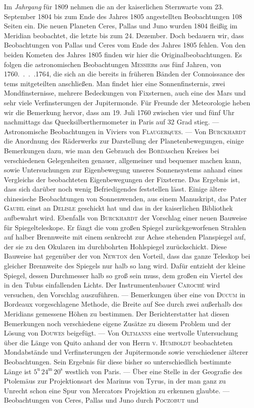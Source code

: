 Im \emph{Jahrgang} für 1809 nehmen die an der kaiserlichen Sternwarte vom 23. September 1804 bis zum Ende des Jahres 1805 angestellten Beobachtungen 108 Seiten ein. Die neuen Planeten Ceres, Pallas und Juno wurden 1804 fleißig im Meridian beobachtet, die letzte bis zum 24. Dezember. Doch bedauern wir, dass Beobachtungen von Pallas und Ceres vom Ende des Jahres 1805 fehlen. Von den beiden Kometen des Jahres 1805 finden wir hier die Originalbeobachtungen. Es folgen die astronomischen Beobachtungen \textsc{Messier}s aus fünf Jahren, von 1760\mbox{. . . .}1764, die sich an die bereits in früheren Bänden der Connoissance des tems mitgeteilten anschließen. Man findet hier eine Sonnenfinsternis, zwei Mondfinsternisse, mehrere Bedeckungen von Fixsternen, auch eine des Mars und sehr viele Verfinsterungen der Jupitermonde. Für Freunde der Meteorologie heben wir die Bemerkung hervor, dass am 19. Juli 1760 zwischen vier und fünf Uhr nachmittags das Quecksilberthermometer in Paris auf 32 Grad stieg. --- Astronomische Beobachtungen in Viviers von \textsc{Flaugerques}. --- Von \textsc{Burckhardt} die Anordnung des Räderwerks zur Darstellung der Planetenbewegungen, einige Bemerkungen dazu, wie man den Gebrauch des \textsc{Borda}schen Kreises bei verschiedenen Gelegenheiten genauer, allgemeiner und bequemer machen kann, sowie Untersuchungen zur Eigenbewegung unseres Sonnensystems anhand eines Vergleichs der beobachteten Eigenbewegungen der Fixsterne. Das Ergebnis ist, dass sich darüber noch wenig Befriedigendes feststellen lässt. Einige ältere chinesische Beobachtungen von Sonnenwenden, aus einem Manuskript, das Pater \textsc{Gaubil} einst an \textsc{Delisle} geschickt hat und das in der kaiserlichen Bibliothek aufbewahrt wird. Ebenfalls von \textsc{Burckhardt} der Vorschlag einer neuen Bauweise für Spiegelteleskope. Er fängt die vom großen Spiegel zurückgeworfenen Strahlen auf halber Brennweite mit einem senkrecht zur Achse stehenden Planspiegel auf, der sie zu den Okularen im durchbohrten Hohlspiegel zurückschickt. Diese Bauweise hat gegenüber der von \textsc{Newton} den Vorteil, dass das ganze Teleskop bei gleicher Brennweite des Spiegels nur halb so lang wird. Dafür entzieht der kleine Spiegel, dessen Durchmesser halb so groß sein muss, dem großen ein Viertel des in den Tubus einfallenden Lichts. Der Instrumentenbauer \textsc{Caroché} wird versuchen, den Vorschlag auszuführen. --- Bemerkungen über eine von \textsc{Ducum} in Bordeaux vorgeschlagene Methode, die Breite auf See durch zwei außerhalb des Meridians gemessene Höhen zu bestimmen. Der Berichterstatter hat diesen Bemerkungen noch verschiedene eigene Zusätze zu diesem Problem und der Lösung von \textsc{Douwes} beigefügt. --- Von \textsc{Oltmanns} eine wertvolle Untersuchung über die Länge von Quito anhand der von Herrn \textsc{v. Humboldt} beobachteten Mondabstände und Verfinsterungen der Jupitermonde sowie verschiedener älterer Beobachtungen. Sein Ergebnis für diese bisher so unterschiedlich bestimmte Länge ist $5^{\mathrm u}\,24^{\mathrm m}\,20^{\mathrm s}$ westlich von Paris. --- Über eine Stelle in der Geografie des Ptolemäus zur Projektionsart des Marinus von Tyrus, in der man ganz zu Unrecht schon eine Spur von Mercators Projektion zu erkennen glaubte. --- Beobachtungen von Ceres, Pallas und Juno durch \textsc{Poczobut} und 